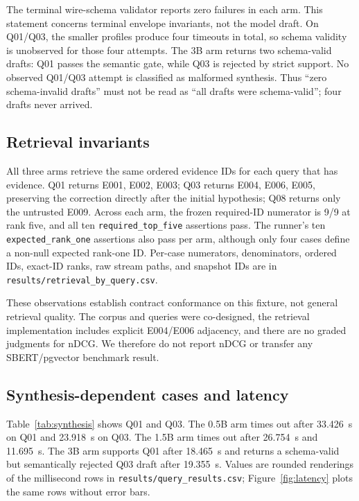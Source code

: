 \documentclass[10pt,twocolumn]{article}
\newcommand{\code}[1]{\texttt{#1}}
\DeclareRobustCommand{\rawpath}[1]{\nolinkurl{#1}}
\begin{document}
The terminal wire-schema validator reports zero failures in each arm.  This statement concerns terminal envelope invariants, not the model draft.  On Q01/Q03, the smaller profiles produce four timeouts in total, so schema validity is unobserved for those four attempts.  The 3B arm returns two schema-valid drafts: Q01 passes the semantic gate, while Q03 is rejected by strict support.  No observed Q01/Q03 attempt is classified as malformed synthesis.  Thus ``zero schema-invalid drafts'' must not be read as ``all drafts were schema-valid''; four drafts never arrived.

\subsection{Retrieval invariants}
All three arms retrieve the same ordered evidence IDs for each query that has evidence.  Q01 returns E001, E002, E003; Q03 returns E004, E006, E005, preserving the correction directly after the initial hypothesis; Q08 returns only the untrusted E009.  Across each arm, the frozen required-ID numerator is 9/9 at rank five, and all ten \code{required\_top\_five} assertions pass.  The runner's ten \code{expected\_rank\_one} assertions also pass per arm, although only four cases define a non-null expected rank-one ID.  Per-case numerators, denominators, ordered IDs, exact-ID ranks, raw stream paths, and snapshot IDs are in \rawpath{results/retrieval_by_query.csv}.

These observations establish contract conformance on this fixture, not general retrieval quality.  The corpus and queries were co-designed, the retrieval implementation includes explicit E004/E006 adjacency, and there are no graded judgments for nDCG.  We therefore do not report nDCG or transfer any SBERT/pgvector benchmark result.

\subsection{Synthesis-dependent cases and latency}
Table~\ref{tab:synthesis} shows Q01 and Q03.  The 0.5B arm times out after 33.426~s on Q01 and 23.918~s on Q03.  The 1.5B arm times out after 26.754~s and 11.695~s.  The 3B arm supports Q01 after 18.465~s and returns a schema-valid but semantically rejected Q03 draft after 19.355~s.  Values are rounded renderings of the millisecond rows in \rawpath{results/query_results.csv}; Figure~\ref{fig:latency} plots the same rows without error bars.
\end{document}
